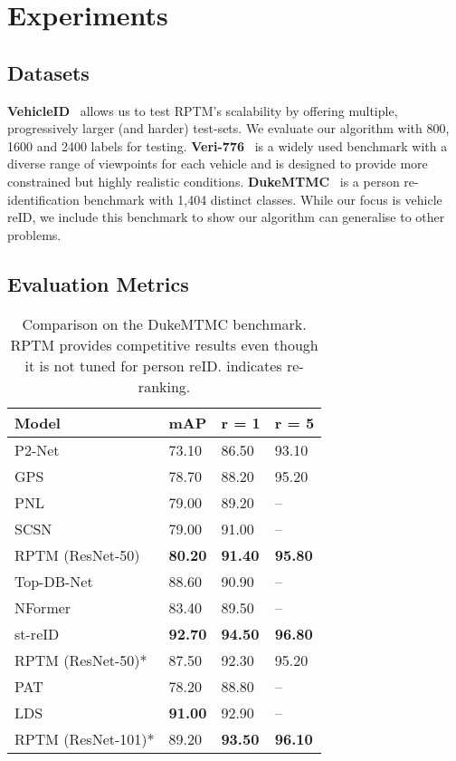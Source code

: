 \documentclass[10pt,twocolumn,letterpaper]{article}
\begin{document}
\section{Experiments}
\subsection{Datasets}
\textbf{VehicleID}~\cite{liu2016deep} 
allows us to  test RPTM's scalability by offering multiple,  progressively larger (and  harder) test-sets. We evaluate our algorithm with 800, 1600 and 2400 labels for testing.
\textbf{Veri-776}~\cite{liu2016large} is a widely used benchmark with a diverse range of viewpoints for each vehicle and is designed to provide more constrained but highly realistic conditions.  \textbf{DukeMTMC}~\cite{ristani2016performance} is a person re-identification benchmark with 1,404 distinct classes. While our focus is vehicle reID, we include this benchmark to show our algorithm
can generalise to other problems. 


\subsection{Evaluation Metrics}

\begin{table}[t]
\begin{center}
\small
\begin{tabular}{P{3.4cm}|P{1cm}|P{1cm}|P{1cm}  }
\hline

\hline
 Model& mAP &r = 1&r = 5\\
 \hline

 P2-Net~\cite{guo2019beyond} &73.10&	86.50&	93.10\\
 GPS~\cite{nguyen2021graph} &78.70&	88.20&	95.20\\
 PNL~\cite{Fu_2022_CVPR} &79.00 & 89.20&--\\
 SCSN~\cite{chen2020salience} &79.00 & 91.00&--\\
 \hline
RPTM (ResNet-50) & \textbf{80.20} & \textbf{91.40} & \textbf{95.80}\\
 \hline
 Top-DB-Net~\cite{quispe2020top} & 88.60	& 90.90 &--\\
 NFormer~\cite{wang2022nformer} & 83.40 & 89.50 & --\\
 st-reID~\cite{wang2019spatial} & \textbf{92.70} &\textbf{94.50}&  \textbf{96.80}\\
 \hline
 RPTM (ResNet-50)* & 87.50 & 92.30 & 95.20\\
 \hline
 
 PAT~\cite{li2021diverse} & 78.20 & 88.80 & --\\
 LDS~\cite{zang2021learning} & \textbf{91.00}& 92.90&--\\	
 \hline
RPTM (ResNet-101)* & 89.20 & \textbf{93.50} & \textbf{96.10}\\
 \hline
 
\hline
\end{tabular}
\end{center}
\caption{Comparison on the DukeMTMC benchmark. RPTM provides competitive results even though it is not tuned for person reID.   indicates re-ranking.}
\label{tab:duke}
\end{table}
\end{document}
